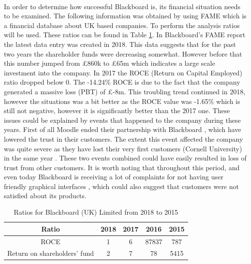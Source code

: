 \documentclass[]{article}
\begin{document}
\paragraph{}
In order to determine how successful Blackboard is, its financial situation needs to be examined. The following information was obtained by using FAME which is a financial database about UK based companies. To perform the analysis ratios will be used. These ratios can be found in Table \ref{tab:Ratios-BB}. In Blackboard's FAME report \cite{FAME-Blackboard} the latest data entry was created in 2018. This data suggests that for the past two years the shareholder funds were decreasing somewhat. However before that this number jumped from £860k to £65m which indicates a large scale investment into the company. In 2017 the ROCE (Return on Capital Employed) ratio dropped below 0. The -14.24\% ROCE is due to the fact that the company generated a massive loss (PBT) of £-8m. This troubling trend continued in 2018, however the situations was a bit better as the ROCE value was -1.65\% which is still not negative, however it is significantly better than the 2017 one. These issues could be explained by events that happened to the company during these years. First of all Moodle ended their partnership with Blackboard \cite{Moodle-breaks-up-with-Blackboard}, which have lowered the trust in their customers. The extent this event affected the company was quite severe as they have lost their very first customers (Cornell University) in the same year \cite{Cornell-leaves-BB}. These two events combined could have easily resulted in loss of trust from other customers. It is worth noting that throughout this period, and even today Blackboard is receiving a lot of complaints for not having user friendly graphical interfaces \cite{BB-Reviews}, which could also suggest that customers were not satisfied about its products.
\begin{table}
\centering
\begin{tabular}{||c | c | c | c | c||} 
\hline
Ratio & 2018 & 2017 & 2016 & 2015 \\ [0.5ex] 
\hline\hline
ROCE & 1 & 6 & 87837 & 787 \\ 
\hline
Return on shareholders' fund & 2 & 7 & 78 & 5415 \\
\hline
\end{tabular}
\caption{Ratios for Blackboard (UK) Limited from 2018 to 2015}
\label{tab:Ratios-BB}
\end{table}

\newpage

\printbibliography{}
\end{document}
